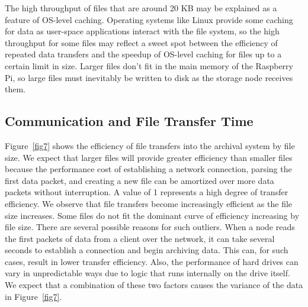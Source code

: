 The high throughput of files that are around 20 KB may be explained as a feature of OS-level caching.  Operating systems like Linux provide some caching for data as user-space applications interact with the file system, so the high throughput for some files may reflect a sweet spot between the efficiency of repeated data transfers and the speedup of OS-level caching for files up to a certain limit in size.  Larger files don't fit in the main memory of the Raspberry Pi, so large files must inevitably be written to disk as the storage node receives them.

\subsection{Communication and File Transfer Time}
Figure~\ref{fig7} shows the efficiency of file transfers into the archival system by file size.  We expect that larger files will provide greater efficiency than smaller files because the performance cost of establishing a network connection, parsing the first data packet, and creating a new file can be amortized over more data packets without interruption.   A value of 1 represents a high degree of transfer efficiency.  We observe that file transfers become increasingly efficient as the file size increases.  Some files do not fit the dominant curve of efficiency increasing by file size.  There are several possible reasons for such outliers.  When a node reads the first packets of data from a client over the network, it can take several seconds to establish a connection and begin archiving data.  This can, for such cases, result in lower transfer efficiency.  Also, the performance of hard drives can vary in unpredictable ways due to logic that runs internally on the drive itself.  We expect that a combination of these two factors causes the variance of the data in Figure~\ref{fig7}.

